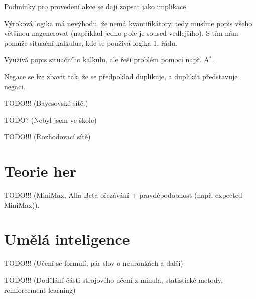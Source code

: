 \documentclass[12pt]{article}					%
\begin{document}
\begin{definice}
	Podmínky pro provedení akce se dají zapsat jako implikace.
\end{definice}

\begin{definice}
	Výroková logika má nevýhodu, že nemá kvantifikátory, tedy musíme popis všeho většinou nagenerovat (například jedno pole je soused vedlejšího). S tím nám pomůže situační kalkulus, kde se používá logika 1. řádu.
\end{definice}

\begin{definice}
	Využívá popis situačního kalkulu, ale řeší problém pomocí např. A$^*$.
\end{definice}

\begin{poznamka}
	Negace se lze zbavit tak, že se předpoklad duplikuje, a duplikát představuje negaci.
\end{poznamka}


TODO!!! (Bayesovské sítě.)


TODO? (Nebyl jsem ve škole)


TODO!!! (Rozhodovací sítě)


\section{Teorie her}

TODO!!! (MiniMax, Alfa-Beta ořezávání + pravděpodobnost (např. expected MiniMax)).


\section{Umělá inteligence}
TODO!!! (Učení se formulí, pár slov o neuronkách a další)


TODO!!! (Dodělání části strojového učení z minula, statistické metody, reinforcement learning)
\end{document}
